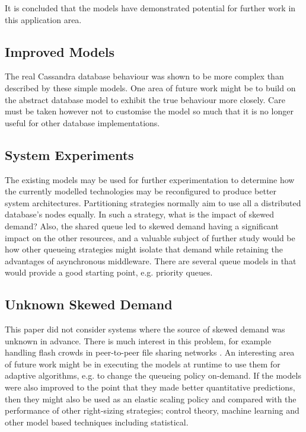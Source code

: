 It is concluded that the models have demonstrated potential for further work in this application area.
	
\subsection{Improved Models}

The real Cassandra database behaviour was shown to be more complex than described by these simple models.  One area of future work might be to build on the abstract database model to exhibit the true behaviour more closely.  Care must be taken however not to customise the model so much that it is no longer useful for other database implementations.

\subsection{System Experiments}

The existing models may be used for further experimentation to determine how the currently modelled technologies may be reconfigured to produce better system architectures.  Partitioning strategies normally aim to use all a distributed database's nodes equally.  In such a strategy, what is the impact of skewed demand?  Also, the shared queue led to skewed demand having a significant impact on the other resources, and a valuable subject of further study would be how other queueing strategies might isolate that demand while retaining the advantages of asynchronous middleware.  There are several queue models in \cite{RN75} that would provide a good starting point, e.g. priority queues.

\subsection{Unknown Skewed Demand}
This paper did not consider systems where the source of skewed demand was unknown in advance.  There is much interest in this problem, for example handling flash crowds in peer-to-peer file sharing networks \cite{RN230}.
An interesting area of future work might be in executing the models at runtime to use them for adaptive algorithms, e.g. to change the queueing policy on-demand.  If the models were also improved to the point that they made better quantitative predictions, then they might also be used as an elastic scaling policy and compared with the performance of other right-sizing strategies; control theory, machine learning and other model based techniques including statistical.

